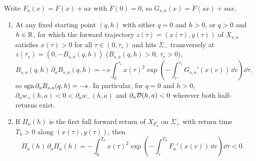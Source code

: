 \begin{lemma}\label{lem:rotational}
Write $F_a(x)=\mathring{F}(x)+ax$ with $\mathring{F}(0)=0$, so $G_{s,a}(x)=\mathring{F}(sx)+sax$.
\begin{enumerate}
  \item[\textup{(i)}] At any fixed starting point $(q,h)$ with either $q=0$ and $h>0$, or $q>0$ and $h\in\mathbb{R}$, for which the forward trajectory $z(\tau)=(x(\tau),y(\tau))$ of $X_{s,a}$ satisfies $x(\tau)>0$ for all $\tau\in(0,\tau_s)$ and hits $\Sigma_-$ transversely at $z(\tau_s)=(0,-B_{s,a}(q,h))$ ($B_{s,a}(q,h)>0$, $\tau_s>0$),
  \begin{equation}\label{eq:rot-half}
    B_{s,a}(q,h)\,\partial_a B_{s,a}(q,h) = -s\int_0^{\tau_s} x(\tau)^2\exp\!\left(-\int_\tau^{\tau_s} G_{s,a}'(x(v))\,\dd v\right)\dd\tau,
  \end{equation}
  so $\operatorname{sgn}\partial_a B_{s,a}(q,h)=-s$. In particular, for $q=0$ and $h>0$, $\partial_a w_+(h,a) < 0 < \partial_a w_-(h,a)$ and $\partial_a\mathcal{D}(h,a)<0$ wherever both half-returns exist.
  \item[\textup{(ii)}] If $\Pi_a(h)$ is the first full forward return of $X_{F_a}$ on $\Sigma_+$ with return time $T_h>0$ along $(x(\tau),y(\tau))$, then
  \begin{equation}\label{eq:rot-full}
    \Pi_a(h)\,\partial_a \Pi_a(h) = -\int_0^{T_h} x(\tau)^2\exp\!\left(-\int_\tau^{T_h} F_a'(x(v))\,\dd v\right)\dd\tau < 0.
  \end{equation}
\end{enumerate}
\end{lemma}

